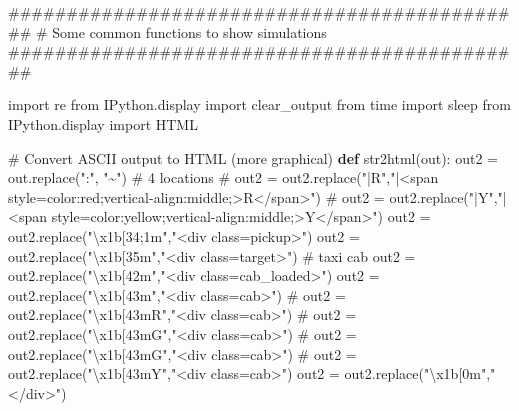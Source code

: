 \documentclass[
  letterpaper,
]{scrbook}
\newenvironment{Shaded}{\begin{snugshade}}{\end{snugshade}}
\newcommand{\CharTok}[1]{\textcolor[rgb]{0.13,0.47,0.30}{#1}}
\newcommand{\CommentTok}[1]{\textcolor[rgb]{0.37,0.37,0.37}{#1}}
\newcommand{\ImportTok}[1]{\textcolor[rgb]{0.00,0.46,0.62}{#1}}
\newcommand{\KeywordTok}[1]{\textcolor[rgb]{0.00,0.23,0.31}{\textbf{#1}}}
\newcommand{\NormalTok}[1]{\textcolor[rgb]{0.00,0.23,0.31}{#1}}
\newcommand{\OperatorTok}[1]{\textcolor[rgb]{0.37,0.37,0.37}{#1}}
\newcommand{\StringTok}[1]{\textcolor[rgb]{0.13,0.47,0.30}{#1}}
\begin{document}
\begin{Shaded}
\begin{Highlighting}[]
\CommentTok{\#\#\#\#\#\#\#\#\#\#\#\#\#\#\#\#\#\#\#\#\#\#\#\#\#\#\#\#\#\#\#\#\#\#\#\#\#\#\#\#\#\#\#\#\#}
\CommentTok{\# Some common functions to show simulations}
\CommentTok{\#\#\#\#\#\#\#\#\#\#\#\#\#\#\#\#\#\#\#\#\#\#\#\#\#\#\#\#\#\#\#\#\#\#\#\#\#\#\#\#\#\#\#\#\#}

\ImportTok{import}\NormalTok{ re}
\ImportTok{from}\NormalTok{ IPython.display }\ImportTok{import}\NormalTok{ clear\_output}
\ImportTok{from}\NormalTok{ time }\ImportTok{import}\NormalTok{ sleep}
\ImportTok{from}\NormalTok{ IPython.display }\ImportTok{import}\NormalTok{ HTML}

\CommentTok{\# Convert ASCII output to HTML (more graphical)}
\KeywordTok{def}\NormalTok{ str2html(out):}
\NormalTok{    out2 }\OperatorTok{=}\NormalTok{ out.replace(}\StringTok{":"}\NormalTok{, }\StringTok{"\textasciitilde{}"}\NormalTok{)}
    \CommentTok{\# 4 locations}
\CommentTok{\#     out2 = out2.replace("|R","|\textless{}span style=\textquotesingle{}color:red;vertical{-}align:middle;\textquotesingle{}\textgreater{}R\textless{}/span\textgreater{}")}
\CommentTok{\#     out2 = out2.replace("|Y","|\textless{}span style=\textquotesingle{}color:yellow;vertical{-}align:middle;\textquotesingle{}\textgreater{}Y\textless{}/span\textgreater{}")}
\NormalTok{    out2 }\OperatorTok{=}\NormalTok{ out2.replace(}\StringTok{"}\CharTok{\textbackslash{}x1b}\StringTok{[34;1m"}\NormalTok{,}\StringTok{"\textless{}div class=\textquotesingle{}pickup\textquotesingle{}\textgreater{}"}\NormalTok{)}
\NormalTok{    out2 }\OperatorTok{=}\NormalTok{ out2.replace(}\StringTok{"}\CharTok{\textbackslash{}x1b}\StringTok{[35m"}\NormalTok{,}\StringTok{"\textless{}div class=\textquotesingle{}target\textquotesingle{}\textgreater{}"}\NormalTok{)}
    \CommentTok{\# taxi cab}
\NormalTok{    out2 }\OperatorTok{=}\NormalTok{ out2.replace(}\StringTok{"}\CharTok{\textbackslash{}x1b}\StringTok{[42m"}\NormalTok{,}\StringTok{"\textless{}div class=\textquotesingle{}cab\_loaded\textquotesingle{}\textgreater{}"}\NormalTok{)}
\NormalTok{    out2 }\OperatorTok{=}\NormalTok{ out2.replace(}\StringTok{"}\CharTok{\textbackslash{}x1b}\StringTok{[43m"}\NormalTok{,}\StringTok{"\textless{}div class=\textquotesingle{}cab\textquotesingle{}\textgreater{}"}\NormalTok{)}
\CommentTok{\#     out2 = out2.replace("\textbackslash{}x1b[43mR","\textless{}div class=\textquotesingle{}cab\textquotesingle{}\textgreater{}")}
\CommentTok{\#     out2 = out2.replace("\textbackslash{}x1b[43mG","\textless{}div class=\textquotesingle{}cab\textquotesingle{}\textgreater{}")}
\CommentTok{\#     out2 = out2.replace("\textbackslash{}x1b[43mG","\textless{}div class=\textquotesingle{}cab\textquotesingle{}\textgreater{}")}
\CommentTok{\#     out2 = out2.replace("\textbackslash{}x1b[43mY","\textless{}div class=\textquotesingle{}cab\textquotesingle{}\textgreater{}")}
\NormalTok{    out2 }\OperatorTok{=}\NormalTok{ out2.replace(}\StringTok{"}\CharTok{\textbackslash{}x1b}\StringTok{[0m"}\NormalTok{,}\StringTok{"\textless{}/div\textgreater{}"}\NormalTok{)}
    

\end{Highlighting}
\end{Shaded}
\end{document}
